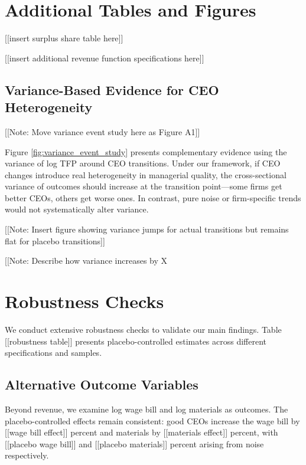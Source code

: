 \documentclass[11pt,a4paper]{article}
\begin{document}



\appendix

\section{Additional Tables and Figures}

[[insert surplus share table here]]

[[insert additional revenue function specifications here]]

\subsection{Variance-Based Evidence for CEO Heterogeneity}

[[Note: Move variance event study here as Figure A1]]

Figure \ref{fig:variance_event_study} presents complementary evidence using the variance of log TFP around CEO transitions. Under our framework, if CEO changes introduce real heterogeneity in managerial quality, the cross-sectional variance of outcomes should increase at the transition point—some firms get better CEOs, others get worse ones. In contrast, pure noise or firm-specific trends would not systematically alter variance.

[[Note: Insert figure showing variance jumps for actual transitions but remains flat for placebo transitions]]

[[Note: Describe how variance increases by X%

\section{Robustness Checks}

We conduct extensive robustness checks to validate our main findings. Table [[robustness table]] presents placebo-controlled estimates across different specifications and samples.

\subsection{Alternative Outcome Variables}

Beyond revenue, we examine log wage bill and log materials as outcomes. The placebo-controlled effects remain consistent: good CEOs increase the wage bill by [[wage bill effect]] percent and materials by [[materials effect]] percent, with [[placebo wage bill]] and [[placebo materials]] percent arising from noise respectively.
\end{document}
